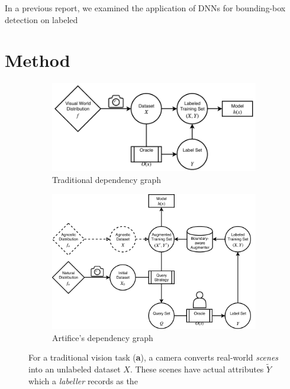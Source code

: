 \documentclass[twocolumn, 10pt]{asme2ej}
\begin{document}
In a previous report, we examined the application of
DNNs for bounding-box detection on labeled 

\section{Method}
\label{sec:method}

\begin{figure}
  \centering
  \begin{subfigure}{0.4\linewidth}
    \includegraphics[width=\columnwidth]{traditional_graph}
    \caption{Traditional dependency graph}
    \label{fig:general-graph}
  \end{subfigure}
  \hspace{0.1\linewidth}
  \begin{subfigure}{0.4\linewidth}
    \includegraphics[width=\columnwidth]{artifice_graph}
    \caption{Artifice's dependency graph}
    \label{fig:artifice-graph}
  \end{subfigure}
  \caption{For a traditional vision task (\textbf{a}), a camera converts
    real-world \textit{scenes} into an unlabeled dataset $X$. These scenes have
    actual attributes $\tilde{Y}$ which a \textit{labeller} records as the
}
\end{figure}
\end{document}
